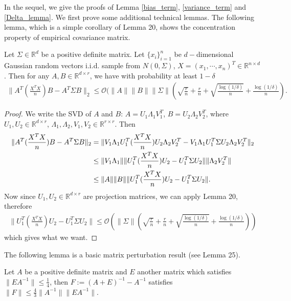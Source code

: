 In the sequel, we give the proofs of Lemma \ref{bias_term}, \ref{variance_term} and \ref{Delta_lemma}. We first prove some additional technical lemmas. The following lemma, which is a simple corollary of \citet{tripuraneni2021provable} Lemma 20, shows the concentration property of empirical covariance matrix.
\begin{lemma} \label{concentration}
Let $\Sigma \in \mathbb{R}^{d}$ be a positive definite matrix. Let $\{x_{i}\}_{i=1}^{n}$ be $d-$dimensional Gaussian random vectors i.i.d. sample from $ N(0,\Sigma)$, $X=(x_{1},\cdots,x_{n})^{T}\in \mathbb{R}^{n \times d}$. Then for any $A,B \in \mathbb{R}^{d \times r}$, we have with probability at least $1-\delta$
\begin{align}
\|A^{T}(\frac{X^{T}X}{n})B - A^{T} \Sigma B \|_{2} \leq \mathcal{O} (\|A\| \|B\| \|\Sigma\| (\sqrt{\frac{r}{n}}+ \frac{r}{n} +\sqrt{ \frac{\log(1/\delta)}{n}}+ \frac{\log(1/\delta)}{n}).
\end{align}
\end{lemma}
\begin{proof}
We write the SVD of $A$ and $B$: $A=U_{1}\Lambda_{1}V_{1}^{T}$, $B=U_{2}\Lambda_{2}V_{2}^{T}$, where $U_{1}, U_{2} \in \mathbb{R}^{d \times r}$, $\Lambda_{1},\Lambda_{2},V_{1},V_{2} \in \mathbb{R}^{r \times r}$. Then 
\begin{align}
\|A^{T}(\frac{X^{T}X}{n})B - A^{T} \Sigma B \|_{2} &= \|V_{1}\Lambda_{1}U_{1}^{T}(\frac{X^{T}X}{n})U_{2}\Lambda_{2}V_{2}^{T} - V_{1}\Lambda_{1}U_{1}^{T}\Sigma U_{2}\Lambda_{2}V_{2}^{T} \|_{2}    \notag \\
&\leq \|V_{1}\Lambda_{1}\| \|U_{1}^{T}(\frac{X^{T}X}{n})U_{2}-U_{1}^{T}\Sigma U_{2}\| \|\Lambda_{2}V_{2}^{T}\| \notag \\
& \leq \|A\| \|B\| \|U_{1}^{T}(\frac{X^{T}X}{n})U_{2}-U_{1}^{T}\Sigma U_{2}\|.
\end{align}
Now since $U_{1},U_{2} \in \mathbb{R}^{d \times r}$ are projection matrices, we can apply \citet{tripuraneni2021provable} Lemma 20, therefore
\begin{align}
\|U_{1}^{T}(\frac{X^{T}X}{n})U_{2}-U_{1}^{T}\Sigma U_{2}\| \leq \mathcal{O} (\|\Sigma\| (\sqrt{\frac{r}{n}}+ \frac{r}{n} +\sqrt{ \frac{\log(1/\delta)}{n}}+ \frac{\log(1/\delta)}{n}))    
\end{align}
which gives what we want.
\end{proof}
The following lemma is a basic matrix perturbation result (see \citet{tripuraneni2021provable} Lemma 25).
\begin{lemma} \label{perturbation}
Let $A$ be a positive definite matrix and $E$ another matrix which satisfies $\|EA^{-1}\|\leq \frac{1}{4}$, then $F:=(A+E)^{-1}-A^{-1}$ satisfies $\|F\| \leq \frac{4}{3} \|A^{-1}\| \|EA^{-1}\|$.
\end{lemma}
